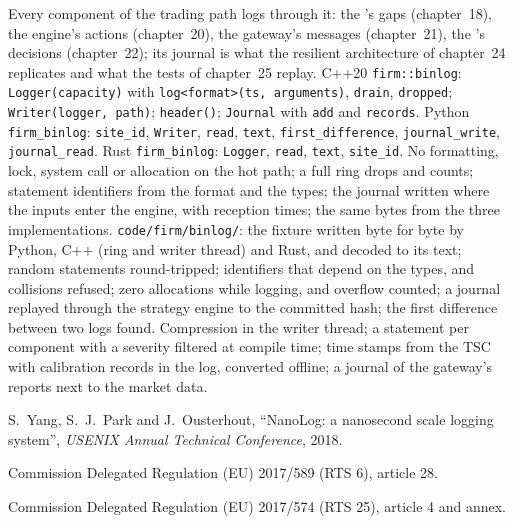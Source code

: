 \begin{build}
 Every component of the trading path logs through it: the 's gaps (chapter~18), the engine's
actions (chapter~20), the gateway's messages (chapter~21), the 's decisions (chapter~22); its journal is what the
resilient architecture of chapter~24 replicates and what the tests of chapter~25 replay.
 C++20 \texttt{firm::binlog}: \texttt{Logger(capacity)} with \texttt{log<\textquotedbl{}format\textquotedbl{}>(ts, arguments)},
\texttt{drain}, \texttt{dropped}; \texttt{Writer(logger, path)}; \texttt{header()}; \texttt{Journal} with \texttt{add} and
\texttt{records}. Python \texttt{firm\_binlog}: \texttt{site\_id}, \texttt{Writer}, \texttt{read}, \texttt{text},
\texttt{first\_difference}, \texttt{journal\_write}, \texttt{journal\_read}. Rust \texttt{firm\_binlog}: \texttt{Logger},
\texttt{read}, \texttt{text}, \texttt{site\_id}.
 No formatting, lock, system call or allocation on the hot path; a full ring drops and counts; statement
identifiers from the format and the types; the journal written where the inputs enter the engine, with reception times; the
same bytes from the three implementations.
 \texttt{code/firm/binlog/}: the fixture written byte for byte by Python, C++ (ring and writer thread)
and Rust, and decoded to its text; random statements round-tripped; identifiers that depend on the types, and collisions
refused; zero allocations while logging, and overflow counted; a journal replayed through the strategy engine to the committed
hash; the first difference between two logs found.
 Compression in the writer thread; a statement per component with a severity filtered at compile time;
time stamps from the TSC with calibration records in the log, converted offline; a journal of the gateway's reports next to
the market data.
\end{build}

\begin{omsources}
\item S.~Yang, S.~J.~Park and J.~Ousterhout, ``NanoLog: a nanosecond scale logging system'', \emph{USENIX Annual Technical
Conference}, 2018.
\item Commission Delegated Regulation (EU) 2017/589 (RTS 6), article 28.
\item Commission Delegated Regulation (EU) 2017/574 (RTS 25), article 4 and annex.
\end{omsources}

